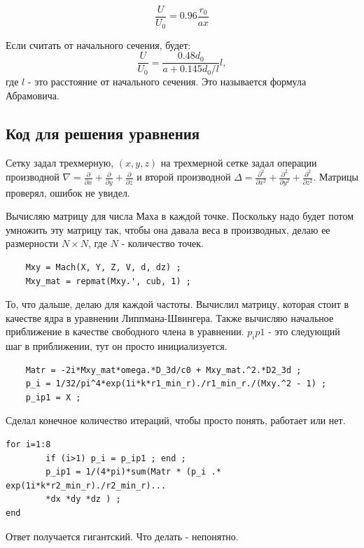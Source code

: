 \documentclass[a4paper,12pt,fleqn]{extreport} %
\begin{document}
\begin{equation}
\frac{U}{U_0} = 0.96 \frac{r_0}{ax}
\end{equation}

Если считать от начального сечения, будет:
\begin{equation}
\frac{U}{U_0} = \frac{0.48 d_0}{a + 0.145 d_0/l} l,
\end{equation}
где $l$ - это расстояние от начального сечения. Это называется формула Абрамовича.

\subsection{Код для решения уравнения}

Сетку задал трехмерную, $(x,y,z)$ на трехмерной сетке задал операции производной $\nabla = \frac{\partial}{\partial x} + \frac{\partial}{\partial y} + \frac{\partial}{\partial z}$ и второй производной $\Delta = \frac{\partial^2}{\partial x^2} + \frac{\partial^2}{\partial y^2} + \frac{\partial^2}{\partial z^2}$. Матрицы проверял, ошибок не увидел.

Вычисляю матрицу для числа Маха в каждой точке. Поскольку надо будет потом умножить эту матрицу так, чтобы она давала веса в производных, делаю ее размерности $N \times N$, где $N$ - количество точек.
\begin{verbatim}
    Mxy = Mach(X, Y, Z, V, d, dz) ;
    Mxy_mat = repmat(Mxy.', cub, 1) ;
\end{verbatim}

То, что дальше, делаю для каждой частоты. Вычислил матрицу, которая стоит в качестве ядра в уравнении Липпмана-Швингера. Также вычисляю начальное приближение в качестве свободного члена в уравнении. $p_ip1$ - это следующий шаг в приближении, тут он просто инициализуется.	
	
\begin{verbatim}
    Matr = -2i*Mxy_mat*omega.*D_3d/c0 + Mxy_mat.^2.*D2_3d ;
    p_i = 1/32/pi^4*exp(1i*k*r1_min_r)./r1_min_r./(Mxy.^2 - 1) ;
    p_ip1 = X ;
\end{verbatim}

Сделал конечное количество итераций, чтобы просто понять, работает или нет. 

\begin{verbatim}
for i=1:8
		if (i>1) p_i = p_ip1 ; end ;
	    p_ip1 = 1/(4*pi)*sum(Matr * (p_i .* exp(1i*k*r2_min_r)./r2_min_r)...
	    *dx *dy *dz ) ;       
end
\end{verbatim}

Ответ получается гигантский. Что делать - непонятно.
\end{document}
